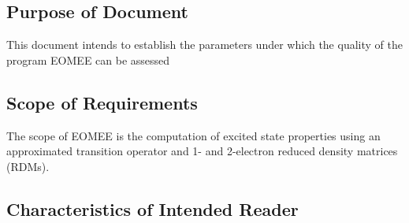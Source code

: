 \documentclass[12pt]{article}
\begin{document}
\subsection{Purpose of Document}


	This document intends to establish the parameters under which the quality 
	of the program EOMEE can be assessed %

\subsection{Scope of Requirements} 

%
The scope of EOMEE is the computation of excited state properties using an 
approximated transition operator and 1- and 2-electron reduced density matrices 
(RDMs).


\subsection{Characteristics of Intended Reader} \label{sec_IntendedReader}
\end{document}
